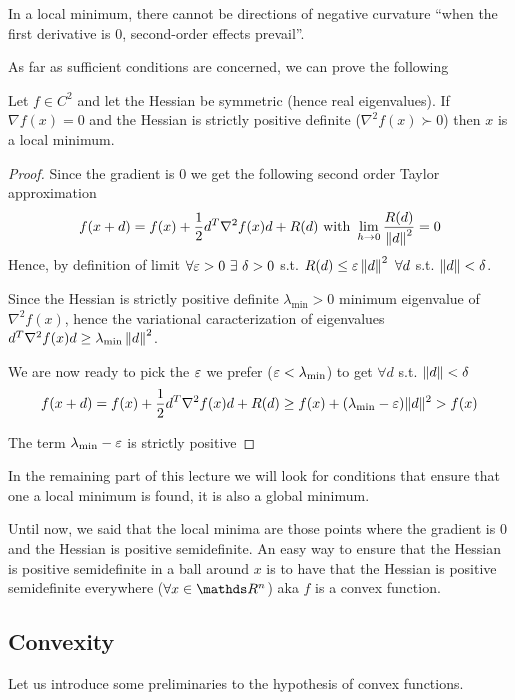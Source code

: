 \documentclass[computational_mathematics.tex]{subfiles}
\begin{document}
  In a local minimum, there cannot be directions of  negative curvature ``when the first derivative is $0$, second-order effects prevail''.

As far as sufficient conditions are concerned, we can prove the following

\begin{proposition}
  Let $f \in C^2$ and let the Hessian be symmetric (hence real eigenvalues).
  If $\nabla f(x) = 0$ and the Hessian is strictly positive definite ($\nabla^2 f(x) \succ 0$) then $x$ is a local minimum.
\end{proposition}

\begin{proof}
Since the gradient is $0$ we get the following second order Taylor approximation
\[
  f(x + d) = f(x) + \frac{1}{2} d^T \nabla^2 f(x) d + R(d)\mbox{ with } \lim\limits_{h \to 0} \frac{R(d)}{\left\lVert d\right\rVert^2} = 0
\]
  Hence, by definition of limit $\forall \varepsilon > 0~\exists~\delta > 0$ s.t. $R(d) \leq \varepsilon \left\lVert d\right\rVert^2~\forall d$ s.t. $\left\lVert d\right\rVert < \delta$.

Since the Hessian is strictly positive definite $\lambda_{\text{min}} > 0$ minimum eigenvalue of $\nabla^2 f(x)$, hence the variational caracterization of eigenvalues $d^T \nabla^2 f(x) d \geq \lambda_{\text{min}} \left\lVert d\right\rVert^2$.

  We are now ready to pick the $\varepsilon$ we prefer ($\varepsilon < \lambda_{\text{min}}$) to get $\forall d$ s.t. $\left\lVert d\right\rVert < \delta$
\[
  f(x + d) = f(x) + \frac{1}{2} d^T \nabla^2 f(x) d + R(d) \geq f(x) + (\lambda_{\text{min}} - \varepsilon)\|d\|^2 > f(x)
\]

  The term $\lambda_{\text{min}} - \varepsilon$ is strictly positive
\end{proof}

In the remaining part of this lecture we will look for conditions that ensure that one a local minimum is found, it is also a global minimum.

Until now, we said that the local minima are those points where the gradient is $0$ and the Hessian is positive semidefinite.
An easy way to ensure that the Hessian is positive semidefinite in a ball around $x$ is to have that the Hessian is positive semidefinite everywhere ($\forall x \in \R^n$) aka $f$ is a convex function.

\subsection{Convexity}
Let us introduce some preliminaries to the hypothesis of convex functions.
\end{document}
